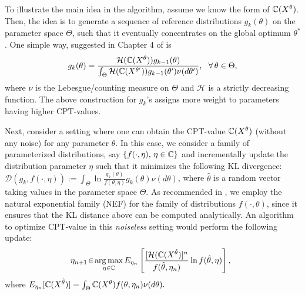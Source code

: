 To illustrate the main idea in the algorithm, assume we know the form of $\mathbb{C}(X^{\theta})$. Then, the idea is to generate a sequence of reference distributions $g_k(\theta)$ on the parameter space $\Theta$, such that it eventually concentrates on the global optimum $\theta^*$. One simple way, suggested in Chapter 4 of \cite{chang2013simulation} is
\begin{equation}
\label{eqn:naive}
g_{k}(\theta)=
\frac{\mathcal{H}(\mathbb{C}(X^{\theta}))g_{k-1}(\theta)}
{\int_{\Theta}\mathcal{H}(\mathbb{C}(X^{\theta'}))g_{k-1}(\theta')\nu(d\theta')},
~~\forall\, \theta \in \Theta,
\end{equation}
where $\nu$ is the Lebesgue/counting measure on $\Theta$ and $\mathcal{H}$ is a strictly decreasing function. The above construction for $g_k$'s assigns more weight to parameters having higher CPT-values.

Next, consider a setting where one can obtain the CPT-value $\mathbb{C}(X^{\theta})$ (without any noise) for any parameter $\theta$. In this case, we consider a family of parameterized distributions, say $\{f(\cdot,\eta),\,\eta\in \mathbb{C} \}$ and incrementally update the distribution parameter $\eta$ such that it minimizes the following KL divergence:
$\mathcal{D}(g_k,f(\cdot,\eta)):=\int_{\Theta}\! \ln \frac{g_{k}(\theta)}{f(\theta,\eta)}g_{k}(\theta)\nu(d\theta)$, 
where $\hat \theta$ is a random vector taking values in the parameter space $\Theta$. 
As recommended in \cite{chang2013simulation}, we employ the natural exponential family (NEF) for the family of distributions $f(\cdot,\theta)$, since it ensures that the KL distance above  can be computed analytically. %
An algorithm to optimize CPT-value in this \textit{noiseless} setting would perform the following update:
\begin{align}
 \label{eqn:interior}
\hspace{-0.5em}\eta_{n+1} \!\in\! \mathop{\rm arg\,max}_{\eta \in \mathbb{C}}
E_{\eta_n}\left[\frac{[\mathcal{H}(\mathbb{C}(X^{\hat \theta})]^{n}}
{f(\hat \theta,\eta_{n})}
\ln f(\hat \theta,\eta)\right],
\end{align}
where $E_{\eta_n}[\mathbb{C}(X^{\hat \theta})]=\int_{\Theta} \mathbb{C}(X^{\theta})f(\theta,\eta_n)\nu(d\theta).$



